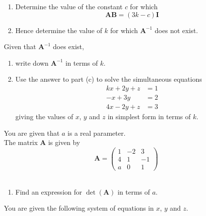 \documentclass[leqno]{article}
\begin{document}
\begin{enumerate}[
  label=\textbf{\arabic*.},
  leftmargin=*,
  topsep=0pt,
  partopsep=0pt,
  parsep=0pt
]
\begin{enumerate}[label=\textbf{(\alph*)}]
  \item Determine the value of the constant $c$ for which
  \[
  \mathbf{AB} = (3k - c)\mathbf{I}
  \]
  \item Hence determine the value of $k$ for which $\mathbf{A}^{-1}$ does not exist.  \\
\end{enumerate}

Given that $\mathbf{A}^{-1}$ does exist, \\

\begin{enumerate}[label=\textbf{(\alph*)}, resume]
  \item write down $\mathbf{A}^{-1}$ in terms of $k$.  \\
  \item Use the answer to part (c) to solve the simultaneous equations
  \[
  \begin{aligned}
  kx + 2y + z &= 1 \\
  -x + 3y &= 2 \\
  4x - 2y + z &= 3
  \end{aligned}
  \]
  giving the values of $x$, $y$ and $z$ in simplest form in terms of $k$.  \\
\end{enumerate}

\newpage

\questionitem

You are given that $a$ is a real parameter. \\

The matrix $\mathbf{A}$ is given by
\[
\mathbf{A}=\begin{pmatrix}
1 & -2 & 3 \\
4 & 1 & -1 \\
a & 0 & 1
\end{pmatrix}
\] \\

\begin{enumerate}[label=\textbf{(\alph*)}]
  \item Find an expression for $\det(\mathbf{A})$ in terms of $a$.  \\
\end{enumerate}

You are given the following system of equations in $x$, $y$ and $z$. \\


\end{enumerate}
\end{document}
